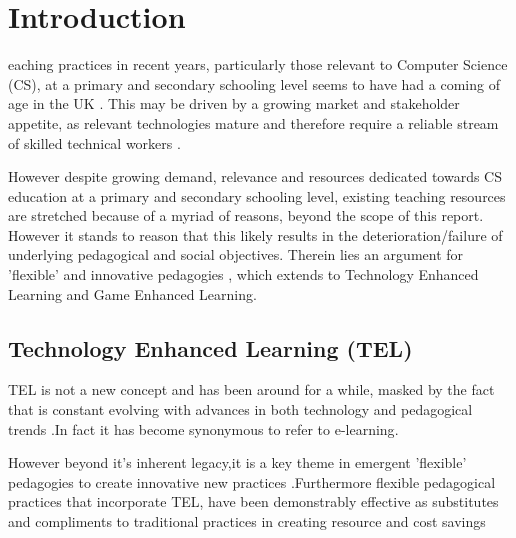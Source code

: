 %
%
%
\let\textcircled=\pgftextcircled
\chapter{Introduction}
\label{chap:intro}

eaching practices in recent years, particularly those relevant to Computer Science (CS), at a primary and secondary schooling level seems to have had a coming of age in the UK \cite{bbcCS1970}. This may be driven by a growing market and stakeholder appetite, as relevant technologies mature and therefore require a reliable stream of skilled technical workers \cite{edugovUK,guardianCSEducation}.

However despite growing demand, relevance and resources dedicated towards CS education at a primary and secondary schooling level, existing teaching resources are stretched because of a myriad of reasons, beyond the scope of this report\cite{guardianTeachingShortage,telegraphTeachingShortage}. However it stands to reason that this likely results in the deterioration/failure of underlying pedagogical and social objectives.
Therein lies  an argument for 'flexible' and innovative pedagogies \cite{heaTelDefinition}, which extends to Technology Enhanced Learning and Game Enhanced Learning.






\section{Technology Enhanced Learning (TEL)}
\label{sec:sec01}

 TEL is not a new concept and has been around for a while, masked by the fact that is constant evolving with advances in both technology and pedagogical trends \cite{UniTexAus}.In fact it has become synonymous  to refer to e-learning\cite{heaTelDefinition}.
 
 However beyond it's inherent legacy,it is a key theme in emergent 'flexible' pedagogies to create innovative new  practices \cite{heaTelDefinition}.Furthermore flexible pedagogical practices that incorporate TEL, have been demonstrably effective as substitutes and compliments to traditional practices in creating resource and cost savings \cite{govUKTELCostSavings}
 
